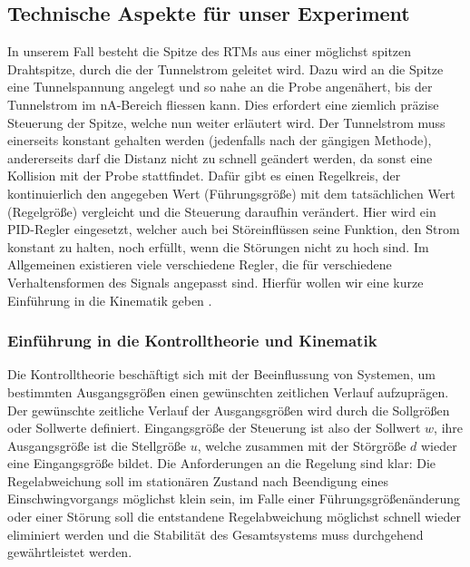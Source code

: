 \subsection{Technische Aspekte für unser Experiment}
In unserem Fall besteht die Spitze des RTMs aus einer möglichst spitzen
Drahtspitze, durch die der Tunnelstrom geleitet wird. Dazu wird an die Spitze eine 
Tunnelspannung angelegt und so nahe an die Probe angenähert, bis der Tunnelstrom 
im nA-Bereich fliessen kann.
Dies erfordert eine ziemlich präzise Steuerung der Spitze, welche nun weiter erläutert wird.
Der Tunnelstrom muss einerseits konstant gehalten werden (jedenfalls nach der gängigen Methode),
andererseits darf die Distanz nicht zu schnell geändert werden, da sonst eine Kollision mit der
Probe stattfindet. Dafür gibt es einen Regelkreis, der kontinuierlich den angegeben Wert
(Führungsgröße) mit dem
tatsächlichen Wert (Regelgröße) vergleicht und
die Steuerung daraufhin verändert. Hier wird ein PID-Regler
eingesetzt, welcher auch bei Störeinflüssen seine Funktion, den Strom konstant zu halten,
noch erfüllt, wenn die Störungen nicht zu hoch sind. Im Allgemeinen existieren viele
verschiedene Regler, die für verschiedene Verhaltensformen des Signals angepasst sind. 
Hierfür wollen wir eine kurze Einführung in die Kinematik geben \cite{regelungstechnik}.
\subsubsection{Einführung in die Kontrolltheorie und Kinematik}
Die Kontrolltheorie beschäftigt sich mit der Beeinflussung von Systemen, um bestimmten
Ausgangsgrößen einen gewünschten zeitlichen Verlauf aufzuprägen\cite{regelungstechnik}.
Der gewünschte zeitliche Verlauf der Ausgangsgrößen wird durch die Sollgrößen oder Sollwerte
definiert. Eingangsgröße der Steuerung ist also der Sollwert $w$, ihre Ausgangsgröße ist die 
Stellgröße $u$, welche zusammen mit der Störgröße $d$ wieder eine Eingangsgröße bildet. Die 
Anforderungen an die Regelung sind klar: Die Regelabweichung soll im stationären Zustand
 nach Beendigung
eines Einschwingvorgangs möglichst klein sein, im Falle einer Führungsgrößenänderung oder einer
Störung soll die entstandene Regelabweichung möglichst schnell wieder eliminiert werden und
die Stabilität des Gesamtsystems muss durchgehend gewährtleistet werden. 

